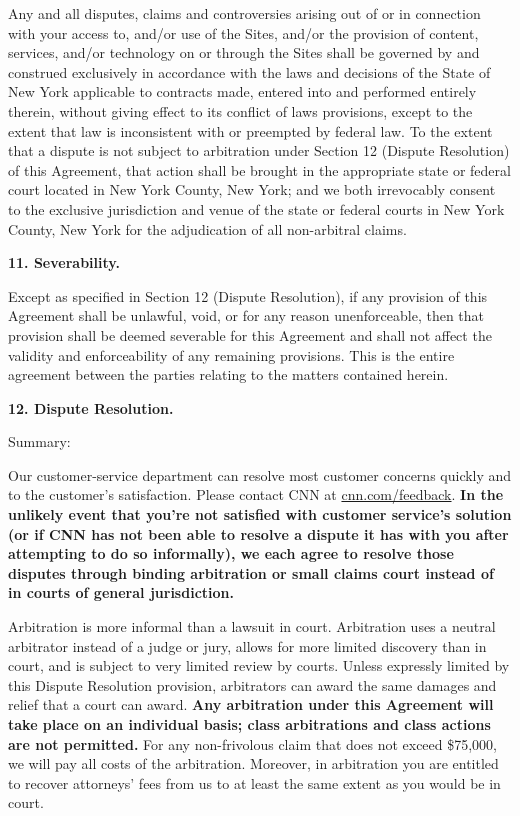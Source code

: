 Any and all disputes, claims and controversies arising out of or in
connection with your access to, and/or use of the Sites, and/or the
provision of content, services, and/or technology on or through the
Sites shall be governed by and construed exclusively in accordance with
the laws and decisions of the State of New York applicable to contracts
made, entered into and performed entirely therein, without giving effect
to its conflict of laws provisions, except to the extent that law is
inconsistent with or preempted by federal law. To the extent that a
dispute is not subject to arbitration under Section 12 (Dispute
Resolution) of this Agreement, that action shall be brought in the
appropriate state or federal court located in New York County, New York;
and we both irrevocably consent to the exclusive jurisdiction and venue
of the state or federal courts in New York County, New York for the
adjudication of all non-arbitral claims.

\textbf{11. Severability.}

Except as specified in Section 12 (Dispute Resolution), if any provision
of this Agreement shall be unlawful, void, or for any reason
unenforceable, then that provision shall be deemed severable for this
Agreement and shall not affect the validity and enforceability of any
remaining provisions. This is the entire agreement between the parties
relating to the matters contained herein.

\textbf{12. Dispute Resolution.}

Summary:

Our customer-service department can resolve most customer concerns
quickly and to the customer's satisfaction. Please contact CNN at
\href{https://www.cnn.com/feedback}{cnn.com/feedback}. \textbf{In the
unlikely event that you're not satisfied with customer service's
solution (or if CNN has not been able to resolve a dispute it has with
you after attempting to do so informally), we each agree to resolve
those disputes through binding arbitration or small claims court instead
of in courts of general jurisdiction.}

Arbitration is more informal than a lawsuit in court. Arbitration uses a
neutral arbitrator instead of a judge or jury, allows for more limited
discovery than in court, and is subject to very limited review by
courts. Unless expressly limited by this Dispute Resolution provision,
arbitrators can award the same damages and relief that a court can
award. \textbf{Any arbitration under this Agreement will take place on
an individual basis; class arbitrations and class actions are not
permitted.} For any non-frivolous claim that does not exceed \$75,000,
we will pay all costs of the arbitration. Moreover, in arbitration you
are entitled to recover attorneys' fees from us to at least the same
extent as you would be in court.


